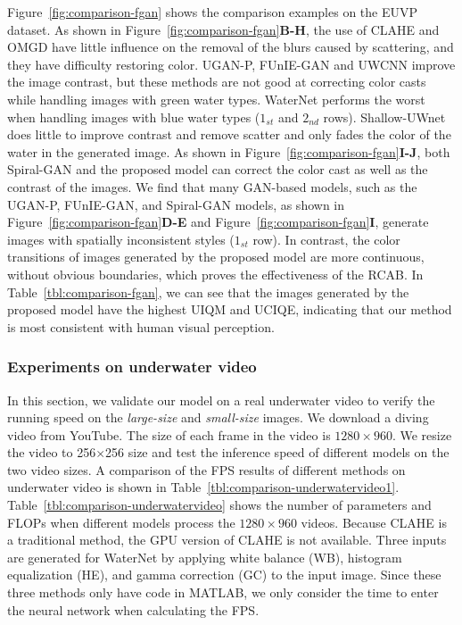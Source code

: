 \documentclass[utf8]{FrontiersinHarvard} %
\begin{document}
Figure~\ref{fig:comparison-fgan} shows the comparison examples on the EUVP dataset. As shown in Figure~\ref{fig:comparison-fgan}\textbf{B-H}, the use of CLAHE and OMGD have little influence on the removal of the blurs caused by scattering, and they have difficulty restoring color. UGAN-P, FUnIE-GAN and UWCNN improve the image contrast, but these methods are not good at correcting color casts while handling images with green water types. WaterNet performs the worst when handling images with blue water types ($1_{st}$ and $2_{nd}$ rows). Shallow-UWnet does little to improve contrast and remove scatter and only fades the color of the water in the generated image. As shown in Figure~\ref{fig:comparison-fgan}\textbf{I-J}, both Spiral-GAN and the proposed model can correct the color cast as well as the contrast of the images. We find that many GAN-based models, such as the UGAN-P, FUnIE-GAN, and Spiral-GAN models, as shown in Figure~\ref{fig:comparison-fgan}\textbf{D-E} and Figure~\ref{fig:comparison-fgan}\textbf{I}, generate images with spatially inconsistent styles ($1_{st}$ row). In contrast, the color transitions of images generated by the proposed model are more continuous, without obvious boundaries, which proves the effectiveness of the RCAB. In Table~\ref{tbl:comparison-fgan}, {we can see that the images generated by the proposed model have the highest UIQM and UCIQE, indicating that our method is most consistent with human visual perception}.

\subsubsection{Experiments on underwater video}
In this section, we validate our model on a real underwater video to verify the running speed on the \textit{large-size} and \textit{small-size} images. We download a diving video from YouTube. The size of each frame in the video is $1280\times960$. We resize the video to 256$\times$256 size and test the inference speed of different models on the two video sizes. A comparison of the FPS results of different methods on underwater video is shown in Table~\ref{tbl:comparison-underwatervideo1}. Table~\ref{tbl:comparison-underwatervideo} shows the number of parameters and FLOPs when different models process the $1280\times960$ videos. Because CLAHE is a traditional method, the GPU version of CLAHE is not available. Three inputs are generated for WaterNet by applying white balance (WB), histogram equalization (HE), and gamma correction (GC) to the input image. Since these three methods only have code in MATLAB, we only consider the time to enter the neural network when calculating the FPS.
\end{document}

